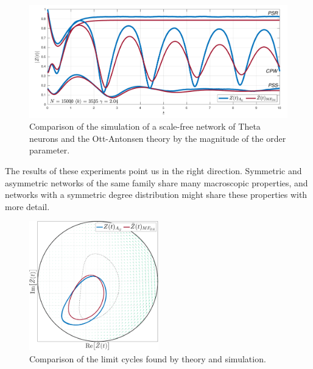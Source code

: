 \begin{figure}[H]
\centering
\includegraphics[width = \textwidth, trim={0 3mm 0 3mm},clip]{../Figures/InspectMeanFieldScaleFree.pdf}
\caption{Comparison of the simulation of a scale-free network of Theta neurons and the Ott-Antonsen theory by the magnitude of the order parameter.}
\label{fig:InspectMeanFieldScaleFree}
\end{figure}

The results of these experiments point us in the right direction. Symmetric and asymmetric networks of the same family share many macroscopic properties, and networks with a symmetric degree distribution might share these properties with more detail. 

\begin{figure}[H]
\centering
\includegraphics[width = 0.5\textwidth]{../Figures/PhaseSpace/ScalefreeLimCycles.pdf}
\caption{Comparison of the limit cycles found by theory and simulation.}
\label{fig:InspectMeanFieldScaleFreePhaseSpace}
\end{figure}


